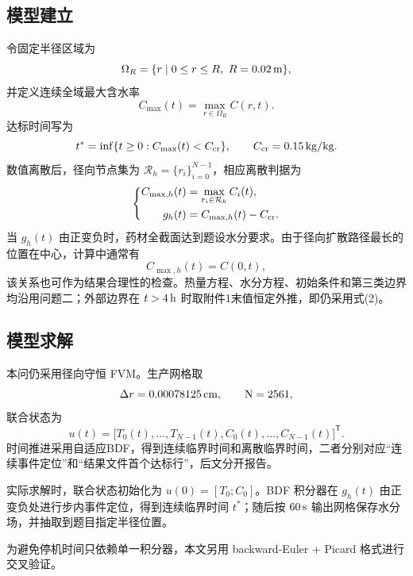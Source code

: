 \documentclass[UTF8,a4paper,12pt]{ctexart}
\begin{document}
\subsection{模型建立}
令固定半径区域为
\begin{equation}
  \Omega_R=\{r\mid 0\le r\le R,\ R=0.02\rm\,m\},
\end{equation}
并定义连续全域最大含水率
\begin{equation}
  C_{\max}(t)=\max_{r\in\Omega_R}C(r,t).
\end{equation}
达标时间写为
\begin{equation}
  t^*=\inf\{t\ge0: C_{\max}(t)<C_{\rm cr}\},\qquad C_{\rm cr}=0.15\rm\,kg/kg.
\end{equation}
数值离散后，径向节点集为 $\mathcal R_h=\{r_i\}_{i=0}^{N-1}$，相应离散判据为
\begin{equation}
\left\{
\begin{aligned}
C_{\max,h}(t)&=\max_{r_i\in\mathcal R_h}C_i(t),\\
g_h(t)&=C_{\max,h}(t)-C_{\rm cr}.
\end{aligned}
\right.
\end{equation}
当 $g_h(t)$ 由正变负时，药材全截面达到题设水分要求。由于径向扩散路径最长的位置在中心，计算中通常有
\begin{equation}
  C_{\max,h}(t)=C(0,t),
\end{equation}
该关系也可作为结果合理性的检查。热量方程、水分方程、初始条件和第三类边界均沿用问题二；外部边界在 $t>4\rm\,h$ 时取附件1末值恒定外推，即仍采用式(2)。

\subsection{模型求解}
本问仍采用径向守恒 FVM。生产网格取
\begin{equation}
  \Delta r=0.00078125\rm\,cm,
  \qquad N=2561,
\end{equation}
联合状态为
\begin{equation}
  u(t)=\bigl[T_0(t),\ldots,T_{N-1}(t),C_0(t),\ldots,C_{N-1}(t)\bigr]^{\mathsf T}.
\end{equation}
时间推进采用自适应BDF，得到连续临界时间和离散临界时间，二者分别对应“连续事件定位”和“结果文件首个达标行”，后文分开报告。

实际求解时，联合状态初始化为 $u(0)=[T_0;C_0]$。BDF 积分器在 $g_h(t)$ 由正变负处进行步内事件定位，得到连续临界时间 $t^*$；随后按 $60\rm\,s$ 输出网格保存水分场，并抽取到题目指定半径位置。

为避免停机时间只依赖单一积分器，本文另用 backward-Euler + Picard 格式进行交叉验证。
\end{document}
